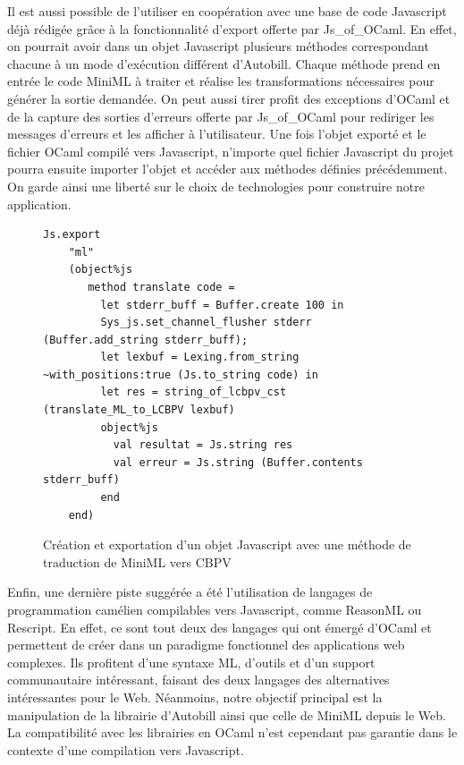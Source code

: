 \documentclass[12pt]{article}
\begin{document}
Il est aussi possible de l'utiliser en coopération avec une base de code Javascript déjà rédigée grâce à la fonctionnalité d'export offerte par Js\_of\_OCaml. En effet, on pourrait avoir dans un objet Javascript plusieurs méthodes correspondant chacune à un mode d'exécution différent d'Autobill. Chaque méthode prend en entrée le code MiniML à traiter et réalise les transformations nécessaires pour générer la sortie demandée. On peut aussi tirer profit des exceptions d'OCaml et de la capture des sorties d'erreurs offerte par Js\_of\_OCaml pour rediriger les messages d'erreurs et les afficher à l'utilisateur. Une fois l'objet exporté et le fichier OCaml compilé vers Javascript, n'importe quel fichier Javascript du projet pourra ensuite importer l'objet et accéder aux méthodes définies précédemment. On garde ainsi une liberté sur le choix de technologies pour construire notre application.\\

\begin{figure}[!b]
      \begin{lstlisting}[language=caml]
Js.export
    "ml"
    (object%js
       method translate code =
         let stderr_buff = Buffer.create 100 in
         Sys_js.set_channel_flusher stderr (Buffer.add_string stderr_buff);
         let lexbuf = Lexing.from_string ~with_positions:true (Js.to_string code) in
         let res = string_of_lcbpv_cst (translate_ML_to_LCBPV lexbuf)
         object%js
           val resultat = Js.string res
           val erreur = Js.string (Buffer.contents stderr_buff)
         end
    end)
\end{lstlisting}
      \caption{Création et exportation d'un objet Javascript avec une méthode de traduction de MiniML vers CBPV}
\end{figure}
Enfin, une dernière piste suggérée a été l'utilisation de langages de programmation camélien compilables vers Javascript, comme ReasonML ou Rescript. En effet, ce sont tout deux des langages qui ont émergé d'OCaml et permettent de créer dans un paradigme fonctionnel des applications web complexes. Ils profitent d'une syntaxe ML, d'outils et d'un support communautaire intéressant, faisant des deux langages des alternatives intéressantes pour le Web. Néanmoins, notre objectif principal est la manipulation de la librairie d'Autobill ainsi que celle de MiniML depuis le Web. La compatibilité avec les librairies en OCaml n'est cependant pas garantie dans le contexte d'une compilation vers Javascript. \\
\end{document}
